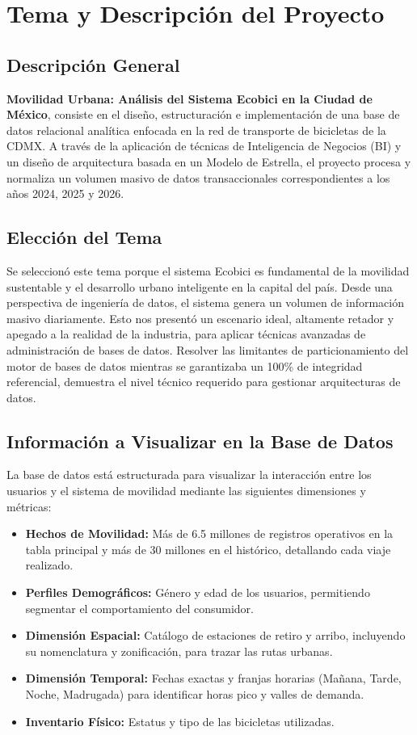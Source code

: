 \documentclass[10pt,a4paper]{article}
\begin{document}
\setcounter{page}{1}


\section{Tema y Descripción del Proyecto}

\subsection{Descripción General}
\textbf{Movilidad Urbana: Análisis del Sistema Ecobici en la Ciudad de México}, 
consiste en el diseño, estructuración e implementación de una base de datos relacional 
analítica enfocada en la red de transporte de bicicletas de la CDMX. A través de la 
aplicación de técnicas de Inteligencia de Negocios (BI) y un diseño de arquitectura basada en 
un Modelo de Estrella, el proyecto procesa y normaliza un volumen masivo de datos transaccionales 
correspondientes a los años 2024, 2025 y 2026. 

\subsection{Elección del Tema}
Se seleccionó este tema porque el sistema Ecobici es fundamental de la movilidad sustentable y el desarrollo
urbano inteligente en la capital del país. Desde una perspectiva de ingeniería de datos, 
el sistema genera un volumen de información masivo diariamente. 
Esto nos presentó un escenario ideal, altamente retador y apegado a la realidad de la industria, 
para aplicar técnicas avanzadas de administración de bases de datos. 
Resolver las limitantes de particionamiento del motor de bases de datos mientras se garantizaba un 
100\% de integridad referencial, demuestra el nivel técnico requerido para gestionar 
arquitecturas de datos.

\subsection{Información a Visualizar en la Base de Datos}
La base de datos está estructurada para visualizar la interacción entre los usuarios y el sistema de movilidad mediante las siguientes dimensiones y métricas:
\begin{itemize}
    \item \textbf{Hechos de Movilidad:} Más de 6.5 millones de registros operativos en la tabla principal y más de 30 millones en el histórico, detallando cada viaje realizado.
    \item \textbf{Perfiles Demográficos:} Género y edad de los usuarios, permitiendo segmentar el comportamiento del consumidor.
    \item \textbf{Dimensión Espacial:} Catálogo de estaciones de retiro y arribo, incluyendo su nomenclatura y zonificación, para trazar las rutas urbanas.
    \item \textbf{Dimensión Temporal:} Fechas exactas y franjas horarias (Mañana, Tarde, Noche, Madrugada) para identificar horas pico y valles de demanda.
    \item \textbf{Inventario Físico:} Estatus y tipo de las bicicletas utilizadas.
\end{itemize}
\end{document}
